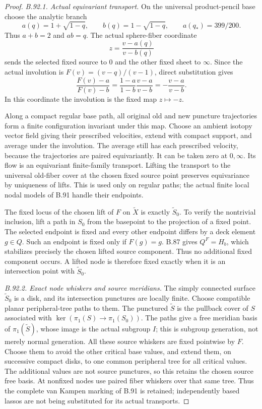 \begin{proof}
\emph{B.92.1. Actual equivariant transport.}
On the universal product-pencil base choose the analytic branch
\[
 a(q)=1+\sqrt{1-q},\qquad b(q)=1-\sqrt{1-q},
 \qquad a(q_*)=399/200.
\]
Thus $a+b=2$ and $ab=q$. The actual sphere-fiber coordinate
\[
                         z=\frac{v-a(q)}{v-b(q)}
\]
sends the selected fixed source to $0$ and the other fixed sheet
to $\infty$. Since the actual involution is
$F(v)=(v-q)/(v-1)$, direct substitution gives
\[
 \frac{F(v)-a}{F(v)-b}
       =\frac{1-a}{1-b}\frac{v-a}{v-b}
       =-\frac{v-a}{v-b}.
\]
In this coordinate the involution is the fixed map $z\mapsto-z$.

Along a compact regular base path, all original old and new puncture
trajectories form a finite configuration invariant under this map.
Choose an ambient isotopy vector field giving their prescribed
velocities, extend with compact support, and average under the
involution. The average still has each prescribed velocity, because
the trajectories are paired equivariantly. It can be taken zero
at $0,\infty$. Its flow is an equivariant finite-family transport.
Lifting the transport to the universal old-fiber cover at the chosen
fixed source point preserves equivariance by uniqueness of lifts.
This is used only on regular paths; the actual finite local nodal
models of B.91 handle their endpoints.

The fixed locus of the chosen lift of $F$ on $\widetilde X$ is
exactly $\widetilde S_0$. To verify the nontrivial inclusion, lift a
path in $S_0$ from the basepoint to the projection of a fixed point.
The selected endpoint is fixed and every other endpoint differs
by a deck element $g\in Q$. Such an endpoint is fixed only if
$F(g)=g$. B.87 gives $Q^F=H_b$, which stabilizes precisely the
chosen lifted source component. Thus no additional fixed component
occurs. A lifted node is therefore fixed exactly when it is an
intersection point with $\widetilde S_0$.

\emph{B.92.2. Exact node whiskers and source meridians.}
The simply connected surface $\widetilde S_0$ is a disk, and its
intersection punctures are locally finite. Choose compatible planar
peripheral-tree paths to them. The punctured $\widetilde S$ is the
pullback cover of $S$ associated with $\ker(\pi_1(S)\to\pi_1(S_0))$.
The paths give a free meridian basis of $\pi_1(\widetilde S)$,
whose image is the actual subgroup $I$;
this is subgroup generation, not merely normal generation.
All these source whiskers are fixed pointwise by $F$.
Choose them to avoid the other critical base values, and extend them,
on successive compact disks, to one common peripheral tree for all
critical values. The additional values are not source punctures, so
this retains the chosen source free basis. At nonfixed nodes use
paired fiber whiskers over that same tree. Thus the complete van
Kampen marking of B.91 is retained; independently based lassos are
not being substituted for its actual transports.


\end{proof}
